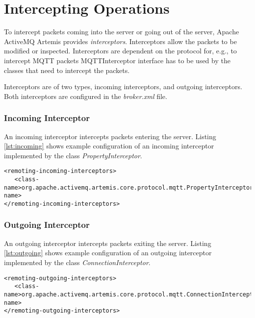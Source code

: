 \section{Intercepting Operations}

To intercept packets coming into the server or going out of the server, Apache ActiveMQ Artemis provides \textit{interceptors}. Interceptors allow the packets to be modified or inspected. Interceptors are dependent on the protocol for, e.g., to intercept MQTT packets MQTTInterceptor interface has to be used by the classes that need to intercept the packets. 

Interceptors are of two types, incoming interceptors, and outgoing interceptors. Both interceptors are configured in the \textit{broker.xml} file.

\subsubsection{Incoming Interceptor}

An incoming interceptor intercepts packets entering the server. Listing \ref{lst:incoming} shows example configuration of an incoming interceptor implemented by the class \textit{PropertyInterceptor}.

\bigskip
\begin{lstlisting}[style=XmlInputStyle,caption=Configuring Incoming Interceptor Example, label={lst:incoming}]
<remoting-incoming-interceptors>
   <class-name>org.apache.activemq.artemis.core.protocol.mqtt.PropertyInterceptor</class-name>
</remoting-incoming-interceptors>
\end{lstlisting}

\subsubsection{Outgoing Interceptor}

An outgoing interceptor intercepts packets exiting the server. Listing \ref{lst:outgoing} shows example configuration of an outgoing interceptor implemented by the class \textit{ConnectionInterceptor}.

\bigskip
\begin{lstlisting}[style=XmlInputStyle,caption=Configuring Outgoing Interceptor Example, label={lst:outgoing}]
<remoting-outgoing-interceptors>
   <class-name>org.apache.activemq.artemis.core.protocol.mqtt.ConnectionInterceptor</class-name>
</remoting-outgoing-interceptors>
\end{lstlisting}
